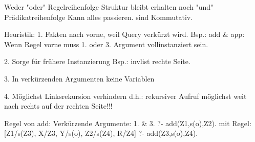 Weder "oder" Regelreihenfolge Struktur bleibt erhalten
noch "und" Prädikatreihenfolge Kann alles passieren.
sind Kommutativ.

Heuristik:
1.
Fakten nach vorne, weil Query verkürzt wird.
Bsp.: add & app: Wenn Regel vorne muss 1. oder 3. Argument vollinstanziert sein.

2.
Sorge für frühere Instanzierung
Bsp.: invlist rechte Seite.

3.
In verkürzenden Argumenten keine Variablen

4.
Möglichst Linksrekursion verhindern
d.h.: rekursiver Aufruf möglichst weit nach rechts auf der rechten Seite!!!



Regel von add:
Verkürzende Argumente: 1. & 3.
?- add(Z1,s(o),Z2).
mit Regel: [Z1/s(Z3), X/Z3, Y/s(o), Z2/s(Z4), R/Z4]
?- add(Z3,s(o),Z4).
